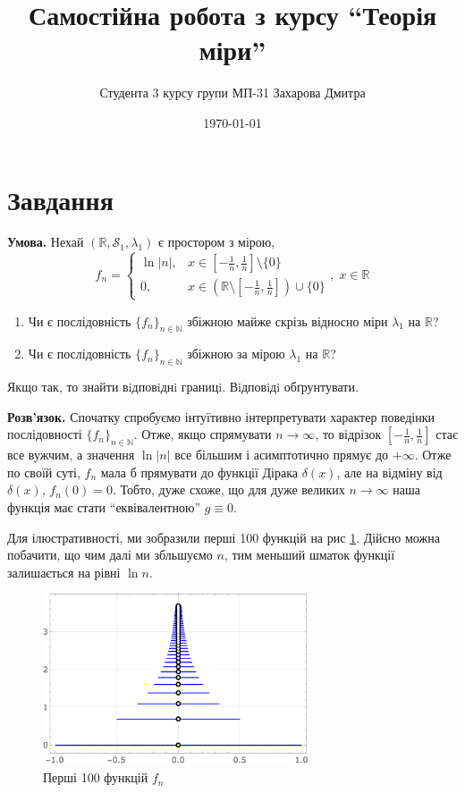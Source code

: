\documentclass[14pt]{extarticle}
\title{Самостійна робота з курсу ``Теорія міри''}
\author{Студента 3 курсу групи МП-31 Захарова Дмитра}
\date{\today}
\begin{document}
\maketitle

\section*{Завдання}
\textbf{Умова.} Нехай $(\mathbb{R},\mathcal{S}_1,\lambda_1)$ є простором з мірою,
\[
f_n = \begin{cases}
    \ln |n|, & x \in \left[-\frac{1}{n},\frac{1}{n}\right] \setminus \{0\} \\
    0, & x \in \left(\mathbb{R} \setminus\left[-\frac{1}{n},\frac{1}{n}\right]\right) \cup \{0\}
\end{cases}, \; x \in \mathbb{R}
\]
\begin{enumerate}
    \item Чи є послідовність $\{f_n\}_{n \in \mathbb{N}}$ збіжною майже скрізь відносно міри $\lambda_1$ на $\mathbb{R}$?
    \item Чи є послідовність $\{f_n\}_{n \in \mathbb{N}}$ збіжною за мірою $\lambda_1$ на $\mathbb{R}$?
\end{enumerate}

Якщо так, то знайти вiдповiднi границi. Вiдповiдi обґрунтувати.

\textbf{Розв'язок.} Спочатку спробуємо інтуїтивно інтерпретувати характер поведінки послідовності $\{f_n\}_{n \in \mathbb{N}}$. Отже, якщо спрямувати $n \to \infty$, то відрізок $[-\frac{1}{n},\frac{1}{n}]$ стає все вужчим, а значення $\ln|n|$ все більшим і асимптотично прямує до $+\infty$. Отже по своїй суті, $f_n$ мала б прямувати до функції Дірака $\delta(x)$, але на відміну від $\delta(x)$, $f_n(0)=0$. Тобто, дуже схоже, що для дуже великих $n \to \infty$ наша функція має стати ``еквівалентною'' $g \equiv 0$. 

Для ілюстративності, ми зобразили перші 100 функцій на рис \ref{fig:plot}. Дійсно можна побачити, що чим далі ми збльшуємо $n$, тим меньший шматок функції залишається на рівні $\ln n$. 

\begin{figure}[H]
    \centering
    \includegraphics[width=0.7\textwidth]{images/hw_10.png}
    \caption{Перші 100 функцій $f_n$}
    \label{fig:plot}
\end{figure}
\end{document}
